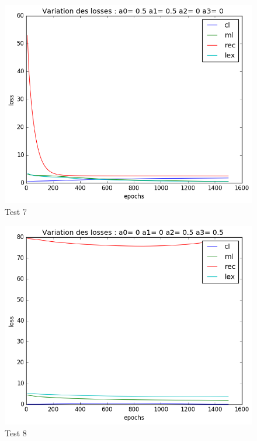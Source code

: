 \documentclass{article}
\begin{document}
\begin{figure}[!h]
  \centering
  \includegraphics[scale=0.8]{img/loss/test7.png}
  \caption{Test 7}
\end{figure}
\begin{figure}[!h]
  \centering
  \includegraphics[scale=0.8]{img/loss/test8.png}
  \caption{Test 8}
\end{figure}
\end{document}
